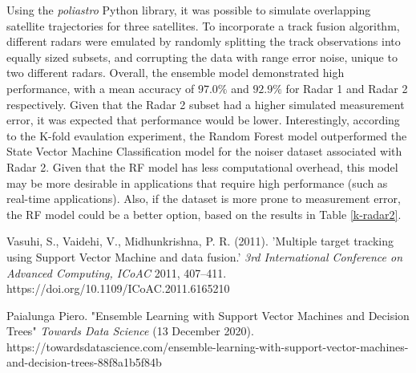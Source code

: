 \documentclass[./report_entry.tex]{subfiles}
\begin{document}
            \noindent Using the \textit{poliastro} Python library, it was possible to simulate overlapping satellite trajectories for three satellites.
            To incorporate a track fusion algorithm, different radars were emulated by randomly splitting the track observations into equally sized subsets, and corrupting
            the data with range error noise, unique to two different radars.
            Overall, the ensemble model demonstrated high performance, with a mean accuracy of $97.0\%$ and $92.9\%$ for
            Radar 1 and Radar 2 respectively.  Given that the Radar 2 subset had a higher simulated measurement error,
            it was expected that performance would be lower.  Interestingly, according to the K-fold evaulation experiment,
            the Random Forest model outperformed the State Vector Machine Classification model for the noiser dataset associated with
            Radar 2.  Given that the RF model has less computational overhead, this model may be more desirable in applications
            that require high performance (such as real-time applications).  Also, if the dataset is more prone to measurement error,
            the RF model could be a better option, based on the results in Table \ref{k-radar2}.
    
    \clearpage
    \begin{thebibliography}{9}

        Vasuhi, S., Vaidehi, V., Midhunkrishna, P. R. (2011). 'Multiple target tracking using Support Vector Machine and data fusion.' \textit{3rd International Conference on Advanced Computing, ICoAC} 2011, 407–411. https://doi.org/10.1109/ICoAC.2011.6165210
        
        Paialunga Piero. "Ensemble Learning with Support Vector Machines and Decision Trees" \textit{Towards Data Science} (13 December 2020).
        https://towardsdatascience.com/ensemble-learning-with-support-vector-machines-and-decision-trees-88f8a1b5f84b   
    
    \end{thebibliography}
\end{document}
